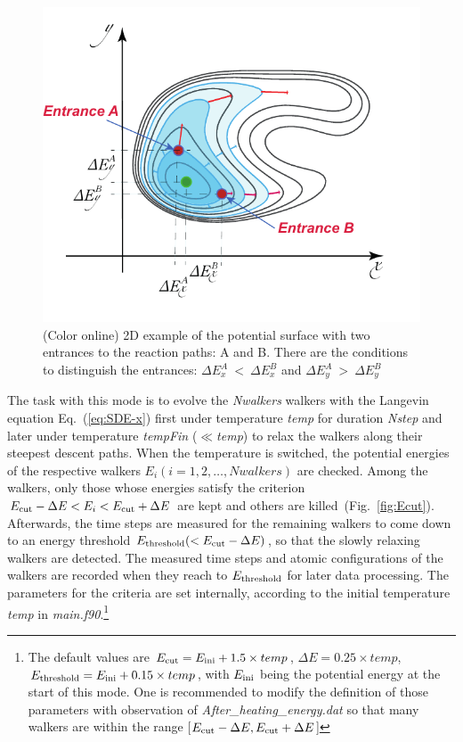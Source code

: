 \documentclass[preprint,12pt]{elsarticle}
\begin{document}
\begin{figure}[!t]
 \begin{center}
 \includegraphics[scale=0.75]{entrances.pdf}
  \caption{(Color online) 2D example of the potential surface with two entrances to the reaction paths: A and B. There are the conditions to distinguish the entrances: $\Delta E_x^A~<~\Delta E_x^B$ and $\Delta E_y^A~>~\Delta E_y^B $ }
  \label{fig:entrances}
 \end{center}
\end{figure}

The task with this mode is to evolve the {\it Nwalkers} walkers with the Langevin equation Eq.~(\ref{eq:SDE-x}) first under temperature {\it temp} for duration {\it Nstep} and later under temperature {\it tempFin} ($\ll${\it temp}) to relax the walkers along their steepest descent paths. When the temperature is switched, the potential energies of the respective walkers $E_{i} (i=1, 2, \dots, Nwalkers)$ are checked. Among the walkers, only those whose energies satisfy the criterion $E_{\rm cut}-\Delta E < E_{i} < E_{\rm cut}+\Delta E$ are kept and others are killed~(Fig.~\ref{fig:Ecut}). Afterwards, the time steps are measured for the remaining walkers to come down to an energy threshold $E_{\rm threshold} (< E_{\rm cut}-\Delta E)$, so that the slowly relaxing walkers are detected. The measured time steps and atomic configurations of the walkers are recorded when they reach to $E_{\rm threshold}$ for later data processing. The parameters for the criteria are set internally, according to the initial temperature {\it temp} in {\it main.f90}.\footnote{The default values are $E_{\rm cut}=E_{\rm ini}+1.5 \times temp$, 
$\Delta E=0.25\times temp$, 
$E_{\rm threshold}=E_{\rm ini}+0.15\times temp$, 
with $E_{\rm ini}$ being the potential energy at the start of this mode. 
One is recommended to modify the definition of those parameters with observation of 
{\it After\_heating\_energy.dat} 
so that many walkers are within the range 
[$E_{\rm cut}-\Delta E, E_{\rm cut}+\Delta E$]}
\end{document}
